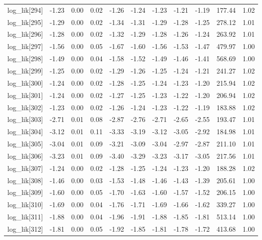 \begin{table}[ht]
\begin{tabular}{rrrrrrrrrrr}
  log\_lik[294] & -1.23 & 0.00 & 0.02 & -1.26 & -1.24 & -1.23 & -1.21 & -1.19 & 177.44 & 1.02 \\ 
  log\_lik[295] & -1.29 & 0.00 & 0.02 & -1.34 & -1.31 & -1.29 & -1.28 & -1.25 & 278.12 & 1.01 \\ 
  log\_lik[296] & -1.28 & 0.00 & 0.02 & -1.32 & -1.29 & -1.28 & -1.26 & -1.24 & 263.92 & 1.01 \\ 
  log\_lik[297] & -1.56 & 0.00 & 0.05 & -1.67 & -1.60 & -1.56 & -1.53 & -1.47 & 479.97 & 1.00 \\ 
  log\_lik[298] & -1.49 & 0.00 & 0.04 & -1.58 & -1.52 & -1.49 & -1.46 & -1.41 & 568.69 & 1.00 \\ 
  log\_lik[299] & -1.25 & 0.00 & 0.02 & -1.29 & -1.26 & -1.25 & -1.24 & -1.21 & 241.27 & 1.02 \\ 
  log\_lik[300] & -1.24 & 0.00 & 0.02 & -1.28 & -1.25 & -1.24 & -1.23 & -1.20 & 215.94 & 1.02 \\ 
  log\_lik[301] & -1.24 & 0.00 & 0.02 & -1.27 & -1.25 & -1.23 & -1.22 & -1.20 & 206.94 & 1.02 \\ 
  log\_lik[302] & -1.23 & 0.00 & 0.02 & -1.26 & -1.24 & -1.23 & -1.22 & -1.19 & 183.88 & 1.02 \\ 
  log\_lik[303] & -2.71 & 0.01 & 0.08 & -2.87 & -2.76 & -2.71 & -2.65 & -2.55 & 193.47 & 1.01 \\ 
  log\_lik[304] & -3.12 & 0.01 & 0.11 & -3.33 & -3.19 & -3.12 & -3.05 & -2.92 & 184.98 & 1.01 \\ 
  log\_lik[305] & -3.04 & 0.01 & 0.09 & -3.21 & -3.09 & -3.04 & -2.97 & -2.87 & 211.10 & 1.01 \\ 
  log\_lik[306] & -3.23 & 0.01 & 0.09 & -3.40 & -3.29 & -3.23 & -3.17 & -3.05 & 217.56 & 1.01 \\ 
  log\_lik[307] & -1.24 & 0.00 & 0.02 & -1.28 & -1.25 & -1.24 & -1.23 & -1.20 & 188.28 & 1.02 \\ 
  log\_lik[308] & -1.46 & 0.00 & 0.03 & -1.53 & -1.48 & -1.46 & -1.43 & -1.39 & 205.61 & 1.00 \\ 
  log\_lik[309] & -1.60 & 0.00 & 0.05 & -1.70 & -1.63 & -1.60 & -1.57 & -1.52 & 206.15 & 1.00 \\ 
  log\_lik[310] & -1.69 & 0.00 & 0.04 & -1.76 & -1.71 & -1.69 & -1.66 & -1.62 & 339.27 & 1.00 \\ 
  log\_lik[311] & -1.88 & 0.00 & 0.04 & -1.96 & -1.91 & -1.88 & -1.85 & -1.81 & 513.14 & 1.00 \\ 
  log\_lik[312] & -1.81 & 0.00 & 0.05 & -1.92 & -1.85 & -1.81 & -1.78 & -1.72 & 413.68 & 1.00 \\ 

\end{tabular}
\end{table}
